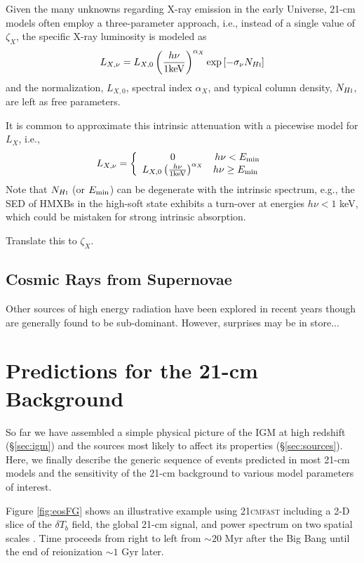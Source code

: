 Given the many unknowns regarding X-ray emission in the early Universe, 21-cm models often employ a three-parameter approach, i.e., instead of a single value of $\zeta_X$, the specific X-ray luminosity is modeled as 
\begin{equation}
	L_{X,\nu} = L_{X,0} \left(\frac{h \nu}{1 \mathrm{keV}} \right)^{\alpha_X} \exp\left[-\sigma_{\nu} N_{H\textsc{i}} \right]
\end{equation}
and the normalization, $L_{X,0}$, spectral index $\alpha_X$, and typical column density, $N_{H\textsc{i}}$, are left as free parameters. 

It is common to approximate this intrinsic attenuation with a piecewise model for $L_X$, i.e., 
\begin{align}
L_{X,\nu} = \left\{ \begin{array}{cc} 
                0 & h\nu < E_{\min} \\
                L_{X,0} \left(\frac{h \nu}{1 \mathrm{keV}} \right)^{\alpha_X} & h\nu \geq E_{\min} \
                \end{array} \right.
\end{align}
Note that $N_{H\textsc{i}}$ (or $E_{\min}$) can be degenerate with the intrinsic spectrum, e.g., the SED of HMXBs in the high-soft state exhibits a turn-over at energies $h\nu < 1$ keV, which could be mistaken for strong intrinsic absorption.

{\color{red} Translate this to $\zeta_X$.}


\subsection{Cosmic Rays from Supernovae}
{\color{red} Other sources of high energy radiation have been explored in recent years though are generally found to be sub-dominant. However, surprises may be in store...}

\section{Predictions for the 21-cm Background} \label{sec:predictions}
So far we have assembled a simple physical picture of the IGM at high redshift (\S\ref{sec:igm}) and the sources most likely to affect its properties (\S\ref{sec:sources}). Here, we finally describe the generic sequence of events predicted in most 21-cm models and the sensitivity of the 21-cm background to various model parameters of interest. 

Figure \ref{fig:eosFG} shows an illustrative example using \textsc{21cmfast} \cite{Mesinger2011} including a 2-D slice of the $\delta T_b$ field, the global 21-cm signal, and power spectrum on two spatial scales \cite{Mesinger2016}. Time proceeds from right to left from $\sim 20$ Myr after the Big Bang until the end of reionization $\sim 1$ Gyr later.

